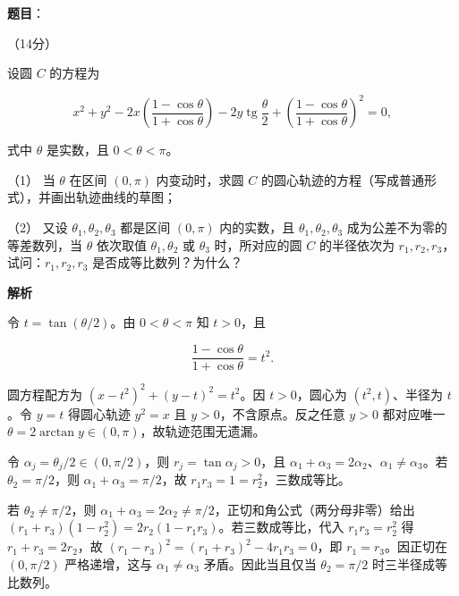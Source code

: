 \begin{answer}

\textbf{题目}：

（14分）

设圆 $C$ 的方程为

\nopagebreak[4]
\[
x^2+y^2-2x\left(\frac{1-\cos\theta}{1+\cos\theta}\right)-2y\operatorname{tg}\frac\theta2+\left(\frac{1-\cos\theta}{1+\cos\theta}\right)^2=0,
\]

式中 $\theta$ 是实数，且 $0<\theta<\pi$。

（1） 当 $\theta$ 在区间 $(0,\pi)$ 内变动时，求圆 $C$ 的圆心轨迹的方程（写成普通形式），并画出轨迹曲线的草图；

（2） 又设 $\theta_1,\theta_2,\theta_3$ 都是区间 $(0,\pi)$ 内的实数，且 $\theta_1,\theta_2,\theta_3$ 成为公差不为零的等差数列，当 $\theta$ 依次取值 $\theta_1,\theta_2$ 或 $\theta_3$ 时，所对应的圆 $C$ 的半径依次为 $r_1,r_2,r_3$，试问：$r_1,r_2,r_3$ 是否成等比数列？为什么？
\nopagebreak[4]
\begin{center}\end{center}
\nopagebreak[4]
\Needspace{0.25\textheight}

\textbf{解析}


令 $t=\tan(\theta/2)$。由 $0<\theta<\pi$ 知 $t>0$，且

\nopagebreak[4]
\[\frac{1-\cos\theta}{1+\cos\theta}=t^2.\]

圆方程配方为 $(x-t^2)^2+(y-t)^2=t^2$。因 $t>0$，圆心为 $(t^2,t)$、半径为 $t$。令 $y=t$ 得圆心轨迹 $y^2=x$ 且 $y>0$，不含原点。反之任意 $y>0$ 都对应唯一 $\theta=2\arctan y\in(0,\pi)$，故轨迹范围无遗漏。


令 $\alpha_j=\theta_j/2\in(0,\pi/2)$，则 $r_j=\tan\alpha_j>0$，且 $\alpha_1+\alpha_3=2\alpha_2$、$\alpha_1\ne\alpha_3$。若 $\theta_2=\pi/2$，则 $\alpha_1+\alpha_3=\pi/2$，故 $r_1r_3=1=r_2^2$，三数成等比。

\Needspace{0.35\textheight}

若 $\theta_2\ne\pi/2$，则 $\alpha_1+\alpha_3=2\alpha_2\ne\pi/2$，正切和角公式（两分母非零）给出 $(r_1+r_3)(1-r_2^2)=2r_2(1-r_1r_3)$。若三数成等比，代入 $r_1r_3=r_2^2$ 得 $r_1+r_3=2r_2$，故 $(r_1-r_3)^2=(r_1+r_3)^2-4r_1r_3=0$，即 $r_1=r_3$。因正切在 $(0,\pi/2)$ 严格递增，这与 $\alpha_1\ne\alpha_3$ 矛盾。因此当且仅当 $\theta_2=\pi/2$ 时三半径成等比数列。



\end{answer}